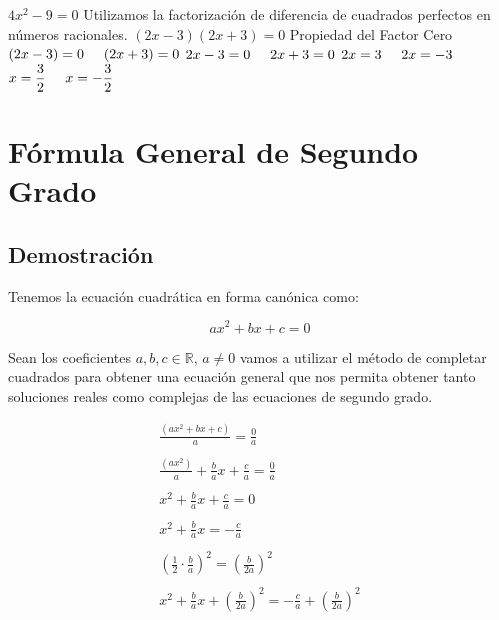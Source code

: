 \documentclass[A4paper, 10pt, oneside]{book}
\begin{document}
\begin{enumerate}
		\begin{tcolorbox}[title=Solución, colback=white]
			$4x^2-9=0$\newline
			Utilizamos la factorización de diferencia de cuadrados perfectos en números racionales.\newline 
			$(2x-3)(2x+3)=0$\newline
			Propiedad del Factor Cero\newline
			$(2x-3)=0 \hspace{5mm} (2x+3)=0$\newline
			$2x-3=0 \hspace{5mm} 2x+3=0$\newline
			$2x=3 \hspace{5mm} 2x=-3$\newline
			$\displaystyle{x=\frac{3}{2} \hspace{5mm} x=-\frac{3}{2}}$
		\end{tcolorbox}
	\end{enumerate}
	\section{Fórmula General de Segundo Grado}
	\subsection{Demostración}
	
	Tenemos la ecuación cuadrática en forma canónica como:
	
	$$ax^2+bx+c=0$$
	
	Sean los coeficientes $a,b,c \in \mathbb{R}$, $a\neq0$ vamos a utilizar el método de completar cuadrados para obtener una ecuación general que nos permita obtener tanto soluciones reales como complejas de las ecuaciones de segundo grado. 
	
	\begin{align*}
		\frac{(ax^2+bx+c)}{a}=\frac{0}{a}\\ \\
		\frac{(ax^2)}{a}+\frac{b}{a} x+\frac{c}{a}=\frac{0}{a}\\ \\
		x^2+\frac{b}{a}x+\frac{c}{a}=0\\ \\
		x^2+\frac{b}{a}x=-\frac{c}{a}\\ \\
		\left(\frac{1}{2}\cdot \frac{b}{a}\right)^2=\left(\frac{b}{2a}\right)^2\\ \\
		x^2+\frac{b}{a}x+\left(\frac{b}{2a}\right)^2=-\frac{c}{a}+\left(\frac{b}{2a}\right)^2
	\end{align*}
\end{document}
